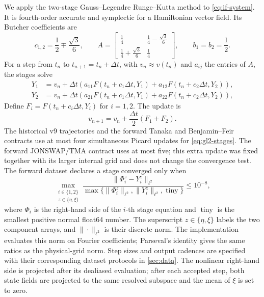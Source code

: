 We apply the two-stage Gauss--Legendre Runge--Kutta method to
\eqref{eq:if-system}. It is fourth-order accurate and symplectic for a
Hamiltonian vector field. Its Butcher coefficients are
\begin{equation}
  c_{1,2}=\frac12\mp\frac{\sqrt3}{6},\qquad
  A=\begin{bmatrix}
  \frac14&\frac14-\frac{\sqrt3}{6}\\[2pt]
  \frac14+\frac{\sqrt3}{6}&\frac14
  \end{bmatrix},\qquad b_1=b_2=\frac12.
  \label{eq:gl2-tableau}
\end{equation}
For a step from $t_n$ to $t_{n+1}=t_n+\Delta t$, with
\(v_n\approx v(t_n)\) and \(a_{ij}\) the entries of \(A\), the stages solve
\begin{align}
  Y_1&=v_n+\Delta t\left(a_{11}F(t_n+c_1\Delta t,Y_1)
                  +a_{12}F(t_n+c_2\Delta t,Y_2)\right),\\
  Y_2&=v_n+\Delta t\left(a_{21}F(t_n+c_1\Delta t,Y_1)
                  +a_{22}F(t_n+c_2\Delta t,Y_2)\right),
  \label{eq:gl2-stages}
\end{align}
Define $F_i=F(t_n+c_i\Delta t,Y_i)$ for $i=1,2$. The update is
\begin{equation}
  v_{n+1}=v_n+\frac{\Delta t}{2}\left(F_1+F_2\right).
  \label{eq:gl2-update}
\end{equation}
The historical v9 trajectories and the forward Tanaka and Benjamin--Feir
contracts use at most four simultaneous Picard updates for
\eqref{eq:gl2-stages}.  The forward JONSWAP/TMA contract uses at most five;
this extra update was fixed together with its larger internal grid and does
not change the convergence test.  The forward dataset declares a stage
converged only when
\begin{equation}
  \max_{\substack{i\in\{1,2\}\\z\in\{\eta,\xi\}}}
  \frac{\|\Phi_i^z-Y_i^z\|_{\ell^2}}
       {\max\{\|\Phi_i^z\|_{\ell^2},
              \|Y_i^z\|_{\ell^2},
              \operatorname{tiny}\}}
  \leq10^{-8},
  \label{eq:gl2-stage-residual}
\end{equation}
where \(\Phi_i\) is the right-hand side of the \(i\)-th stage equation and
\(\operatorname{tiny}\) is the smallest positive normal float64 number. The
superscript \(z\in\{\eta,\xi\}\) labels the two component arrays, and
\(\|\cdot\|_{\ell^2}\) is their discrete norm. The implementation evaluates
this norm on Fourier coefficients; Parseval's identity gives the same ratios
as the physical-grid norm. Step sizes and output cadences are specified with
their corresponding dataset protocols in \cref{sec:data}. The nonlinear
right-hand side is projected after its dealiased evaluation; after each
accepted step, both state fields are projected to the same resolved subspace
and the mean of \(\xi\) is set to zero.

